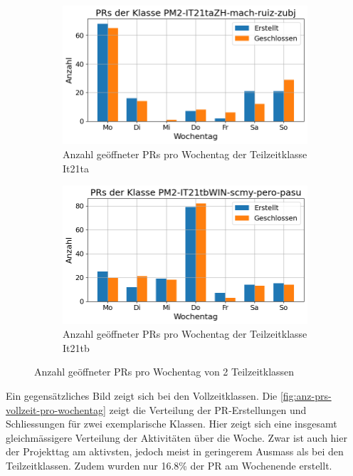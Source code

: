 \begin{figure}[htbp]
    \centering
    \begin{subfigure}[b]{0.48\textwidth}
        \centering
        \includegraphics[width=\textwidth]{Figures/pr-klasse-per-wochentag-it21ta.png}
         \caption{Anzahl geöffneter PRs pro Wochentag der Teilzeitklasse It21ta}
        \label{fig:anzahl-prs-pro-wochentag-it21ta}
    \end{subfigure}
    \hfill
    \begin{subfigure}[b]{0.48\textwidth}
        \centering
        \includegraphics[width=\textwidth]{Figures/pr-klasse-per-wochentag-21tb.png}
         \caption{Anzahl geöffneter PRs pro Wochentag der Teilzeitklasse It21tb}
        \label{fig:anzahl-prs-pro-wochentag-it21tb}
    \end{subfigure}
    \caption{Anzahl geöffneter PRs pro Wochentag von 2 Teilzeitklassen}
    \label{fig:anz-prs-teilzeit-pro-wochentag}
\end{figure}

Ein gegensätzliches Bild zeigt sich bei den Vollzeitklassen. Die \autoref{fig:anz-prs-vollzeit-pro-wochentag} zeigt die Verteilung der PR-Erstellungen und Schliessungen für zwei exemplarische Klassen.
Hier zeigt sich eine insgesamt gleichmässigere Verteilung der Aktivitäten über die Woche. Zwar ist auch hier der Projekttag am aktivsten, jedoch meist in geringerem Ausmass als bei den Teilzeitklassen. Zudem wurden nur 16.8\% der PR am Wochenende erstellt.

